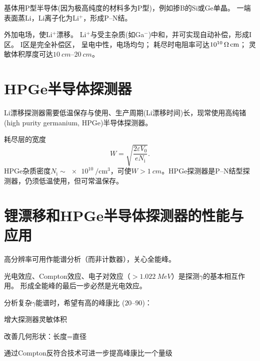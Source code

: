 基体用P型半导体(因为极高纯度的材料多为P型)，例如掺B的Si或Ge单晶。
一端表面蒸Li，Li离子化为Li$^+$，形成P--N结。

外加电场，使Li$^+$漂移。
Li$^+$与受主杂质(如Ga$^-$)中和，并可实现自动补偿，形成I区。
I区是完全补偿区，
呈电中性，电场均匀；
耗尽时电阻率可达$\qty{E10}{\ohm\centi\metre}$；
灵敏体积厚度可达$\qtyrange{10}{20}{cm}$。

\section{HPGe半导体探测器}

Li漂移探测器需要低温保存与使用、生产周期(Li漂移时间)长，现常使用高纯锗(high purity germanium, HPGe)半导体探测器。%

耗尽层的宽度
\begin{equation}\label{eq:nrd-depletion-width}
	W = \sqrt{\frac{2\varepsilon V_0}{eN_{\mathrm{i}}}}.
\end{equation}
HPGe杂质密度$N_{\mathrm{i}} \sim \qty{e10}{\per\centi\metre\cubed}$，可使$W > \qty{1}{cm}$。HPGe探测器是P--N结型探测器，仍须低温使用，但可常温保存。

\section{锂漂移和HPGe半导体探测器的性能与应用}

高分辨率可用作能谱分析（而非计数器），关心全能峰。

光电效应、Compton效应、电子对效应（$> \qty{1.022}{MeV}$）是探测$\gamma$的基本相互作用。
形成全能峰的最后一步必然是光电效应。

分析复杂$\gamma$能谱时，希望有高的峰康比
($\numrange{20}{90}$)：
\begin{compactenum}
	\item 增大探测器灵敏体积
	\item 改善几何形状：长度=直径
	\item 通过Compton反符合技术可进一步提高峰康比一个量级
\end{compactenum}

